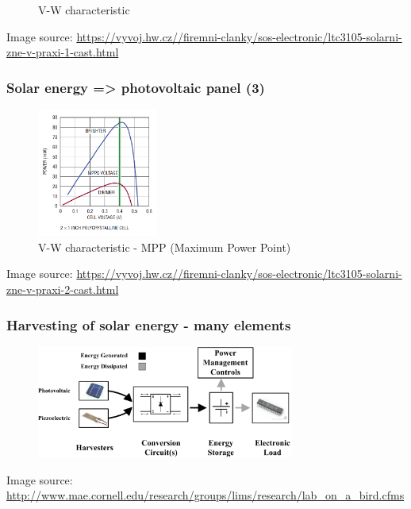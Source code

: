 \documentclass[12;pt,t]{beamer} %
\newcommand{\srctext}[1]{{\fontsize{7}{9}\selectfont\textcolor{sourcesclr}{#1}}}
\begin{document}
\begin{frame}
\begin{figure}[h]
\begin{minipage}[b]{.42\textwidth}
                \caption{V-W characteristic}
           	\end{minipage}
        \end{figure}
    \srctext{Image source: \url{https://vyvoj.hw.cz//firemni-clanky/sos-electronic/ltc3105-solarni-zne-v-praxi-1-cast.html}}
\end{frame}

\begin{frame}
    \frametitle{Solar energy => photovoltaic panel (3)}
        \begin{figure}[h]
      		\centering
       		\includegraphics[width=150px]{img/photovoltaic-panel-WV-char-MPP.png}
            \caption{V-W characteristic - MPP (Maximum Power Point)}
        \end{figure}

    \srctext{Image source: \url{https://vyvoj.hw.cz//firemni-clanky/sos-electronic/ltc3105-solarni-zne-v-praxi-2-cast.html}}
\end{frame}

\begin{frame}
    \frametitle{Harvesting of solar energy - many elements}    	
        \begin{figure}[H]
            \includegraphics[width=320px]{img/energy_harvesting_block_diagram.png}
       	\end{figure}
    \srctext{Image source: \url{http://www.mae.cornell.edu/research/groups/lims/research/lab_on_a_bird.cfms}}
\end{frame}
\end{document}
